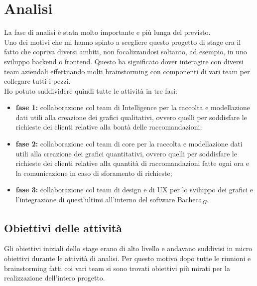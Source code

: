\documentclass[a4paper, 12pt, twoside, openright]{book}
\newcommand{\gloss}[1]{#1\textsubscript{\textit{\tiny{G}}}}
\begin{document}
\newpage{}
\section{Analisi}
\label{analisi}
La fase di analisi è stata molto importante e più lunga del previsto.\\
Uno dei motivi che mi hanno spinto a scegliere questo progetto di stage era il fatto che copriva diversi ambiti, non focalizzandosi soltanto, ad esempio, in uno sviluppo backend o frontend. Questo ha significato dover interagire con diversi team aziendali effettuando molti brainstorming con componenti di vari team per collegare tutti i pezzi.\\

Ho potuto suddividere quindi tutte le attività in tre fasi:
\begin{itemize}
\item \textbf{fase 1:} collaborazione col team di Intelligence per la raccolta e modellazione dati utili alla creazione dei grafici qualitativi, ovvero quelli per soddisfare le richieste dei clienti relative alla bontà delle raccomandazioni;
\item \textbf{fase 2:} collaborazione col team di core per la raccolta e modellazione dati utili alla creazione dei grafici quantitativi, ovvero quelli per soddisfare le richieste dei clienti relative alla quantità di raccomandazioni fatte ogni ora e la comunicazione in caso di sforamento di richieste;
\item \textbf{fase 3:} collaborazione col team di design e di UX per lo sviluppo dei grafici e l'integrazione di quest'ultimi all'interno del software \gloss{Bacheca}.
\end{itemize}

\newpage{}
\subsection{Obiettivi delle attività}
Gli obiettivi iniziali dello stage erano di alto livello e andavano suddivisi in micro obiettivi durante le attività di analisi. Per questo motivo dopo tutte le riunioni e brainstorming fatti coi vari team si sono trovati obiettivi più mirati per la realizzazione dell'intero progetto.\\
\end{document}
